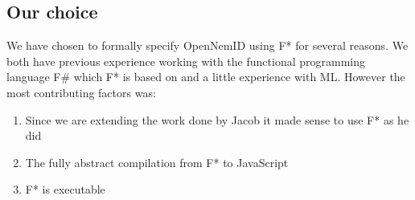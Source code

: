 \documentclass[twosided]{report}
\begin{document}
\subsection{Our choice}
We have chosen to formally specify OpenNemID using F* for several reasons. We both have previous experience working with the functional programming language F\# which F* is based on and a little experience with ML. However the most contributing factors was:
\begin{enumerate}
\item Since we are extending the work done by Jacob it made sense to use F* as he did
\item The fully abstract compilation from F* to JavaScript
\item F* is executable
\end{enumerate}
\end{document}
